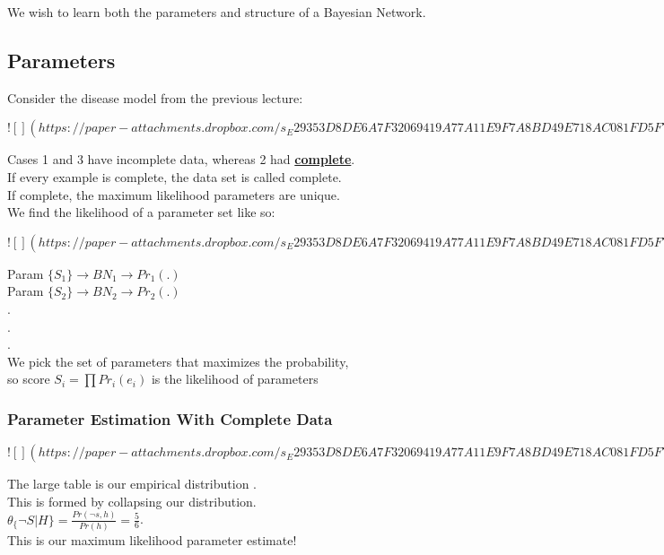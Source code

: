 \documentclass[../../lecture_notes.tex]{subfiles}
\begin{document}
\noindent We wish to learn both the parameters and structure of a Bayesian Network.

\subsection*{Parameters}
\noindent Consider the disease model from the previous lecture:

\newpage
$![](https://paper-attachments.dropbox.com/s_E29353D8DE6A7F32069419A77A11E9F7A8BD49E718AC081FD5F77701FB86FF68_1590905476354_Untitled+drawing.jpg)$
\newpage

\noindent Cases 1 and 3 have incomplete data, whereas 2 had \textbf{\underline{complete}}.\\
If every example is complete, the data set is called complete.\\
If complete, the maximum likelihood parameters are unique.\\
We find the likelihood of a parameter set like so:

\newpage
$![](https://paper-attachments.dropbox.com/s_E29353D8DE6A7F32069419A77A11E9F7A8BD49E718AC081FD5F77701FB86FF68_1590905790509_Untitled+drawing+1.jpg)$
\newpage


\noindent Param $\{S_1\} \rightarrow BN_1 \rightarrow Pr_1(.)$\\
Param $\{S_2\} \rightarrow BN_2 \rightarrow Pr_2(.)$\\
.\\
.\\
.\\
We pick the set of parameters that maximizes the probability,\\
	\indent so score $S_i = \prod Pr_i (e_i)$ is the likelihood of parameters\\


\subsubsection*{Parameter Estimation With Complete Data}

\newpage
$![](https://paper-attachments.dropbox.com/s_E29353D8DE6A7F32069419A77A11E9F7A8BD49E718AC081FD5F77701FB86FF68_1590906656594_Untitled+drawing+2.jpg)$

\noindent The large table is our empirical distribution .\\
This is formed by collapsing our distribution.\\
	\indent $\theta_\{\neg S|H\} = \frac{Pr(\neg s,h)}{Pr(h)} = \frac{5}{6}$.\\
This is our maximum likelihood parameter estimate!
\end{document}
